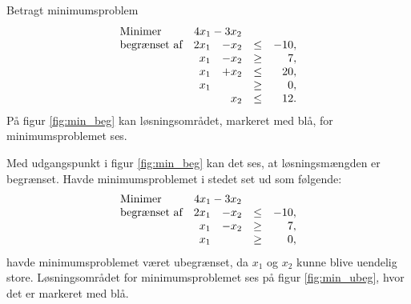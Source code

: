 \begin{eks}
Betragt minimumsproblem
%
\begin{align*}
\begin{array}{lrrlr}
\text{Minimer}		&	\multicolumn{2}{c}{4x_1-3x_2}  &\\
\text{begrænset af}	&2x_1& - x_2			&\leq 	&-10,\\
					&x_1& - x_2				&\geq	& 7,\\
					&x_1& + x_2				&\leq	& 20,\\
					&x_1&					&\geq	& 0,\\
					& &x_2					&\leq	& 12.
\end{array}
\end{align*}
%
På figur \ref{fig:min_beg} kan løsningsområdet, markeret med blå, for minimumsproblemet ses.
%

\noindent
%
Med udgangspunkt i figur \ref{fig:min_beg} kan det ses, at løsningsmængden er begrænset.
% 
Havde minimumsproblemet i stedet set ud som følgende: 
%
\begin{align*}
\begin{array}{lrrlr}
\text{Minimer}		&\multicolumn{2}{c}{4x_1-3x_2}  &\\
\text{begrænset af}	&2x_1& - x_2			&\leq 	&-10,\\
					&x_1& - x_2				&\geq	& 7,\\
					&x_1&					&\geq	& 0,
\end{array}
\end{align*}
havde minimumsproblemet været ubegrænset, da $x_1$ og $x_2$ kunne blive uendelig store. 
Løsningsområdet for minimumsproblemet ses på figur \ref{fig:min_ubeg}, hvor det er markeret med blå.
%

%
\end{eks}